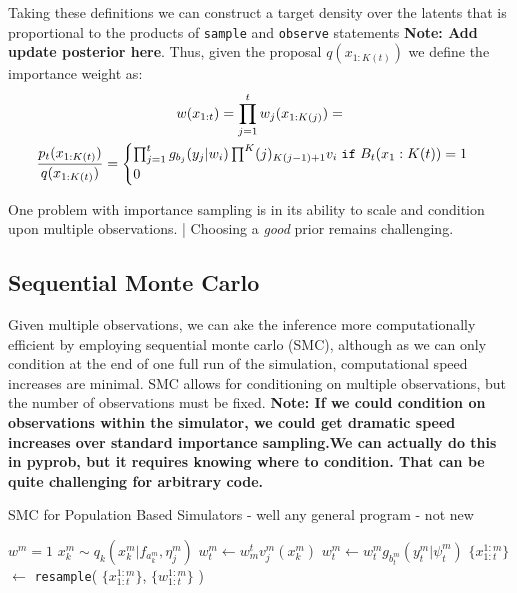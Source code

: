 \documentclass{article}
\begin{document}
Taking these definitions we can construct a target density over the 
latents that is proportional to the products of \texttt{sample} and \texttt{observe}
statements \textbf{Note: Add update posterior here}.
Thus, given the proposal $q(x_{1:K(t)})$ we define the importance weight as:
\begin{multline}
  w(x_{1:t}) = \prod^{t}_{j=1} w_j (x_{1:K(j)}) = \\
   \frac{p_t(x_{1:K(t)})}{q(x_{1:K(t)})} =
 \begin{cases}
  \prod^{t}_{j=1}g_{b_j}(y_j | w_i)\prod^K(j)_{K(j-1)+1} v_i \hspace{0.1cm} \texttt{if} \hspace{0.1cm} B_t(x_1:K(t))=1 \\
  0
 \end{cases}
\end{multline}

One problem with importance sampling is in its ability to scale and condition upon multiple observations. |
Choosing a \emph{good} prior remains challenging. 

\subsection{Sequential Monte Carlo}
Given multiple observations, we can ake the inference more computationally efficient 
by employing sequential monte carlo (SMC), although as we can only condition at the end 
of one full run of the simulation, computational speed increases are minimal.
SMC allows for conditioning on multiple observations, but the number of observations must
be fixed. \textbf{Note: If we could condition on observations within the simulator, we 
could get dramatic speed increases over standard importance sampling.We can actually do this 
in pyprob, but it requires knowing where to condition. That can be quite challenging 
for arbitrary code. }


\begin{algorithm}
    \caption{SMC for Population Based Simulators - well any general program - not new}
    \label{alg:euclid}
    \begin{algorithmic}[1] %
              \State $w^{m} = 1  $
                \State $x^m_k \sim q_k(x^m_k | f_{a^{m}_{k}},\eta^{m}_{j})$
                \State $w^m_t \gets w^t_m v_j^m(x_k^m)$
                \EndFor
            \EndFor
          \State $w^m_t \gets w^m_t g_{b_{t}^m}(y_t^m | \psi^m_t)$
          \State $\{x^{1:m}_{1:t}\}$ $\gets$ \texttt{resample}( $\{x^{1:m}_{1:t}\}$,  $\{w^{1:m}_{1:t}\}$ )
        \EndFor
        \EndProcedure
    \end{algorithmic}
\end{algorithm}
\end{document}
